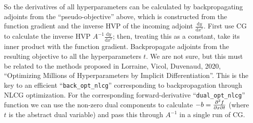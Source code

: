 \documentclass[11pt]{article}
\renewcommand{\(}{\left(}
\renewcommand{\)}{\right)}
\newcommand{\partbyby}[3]{{\partial^2 #1\over \partial #2 \partial #3}}
\newcommand{\ud}{\mathrm{d}}
\newcommand{\dby}[2]{\frac{\ud #1}{\ud #2}}
\begin{document}
So the derivatives of all hyperparameters can be calculated by
backpropagating adjoints from the ``pseudo-objective'' above, which is
constructed from the function gradient and the inverse HVP of the
incoming adjoint $\dby{y}{x^*}$. First use CG to calculate the inverse
HVP $A^{-1} \dby{y}{x^*}$; then, treating this as a constant, take its
inner product with the function gradient. Backpropagate adjoints from
the resulting objective to all the hyperparameters $t$. We are not
sure, but this must be related to the methods proposed in Lorraine,
Vicol, Duvenaud, 2020, ``Optimizing Millions of Hyperparameters by
Implicit Differentiation''. This is the key to an efficient
``\verb|back_opt_nlcg|'' corresponding to backpropagation through NLCG
optimization. For the corresponding forward-derivative
``\verb|dual_opt_nlcg|'' function we can use the non-zero dual
components to calculate $-b=\partbyby{f}{x}{t}$ (where $t$ is the
abstract dual variable) and pass this through $A^{-1}$ in a single run
of CG.
\end{document}

